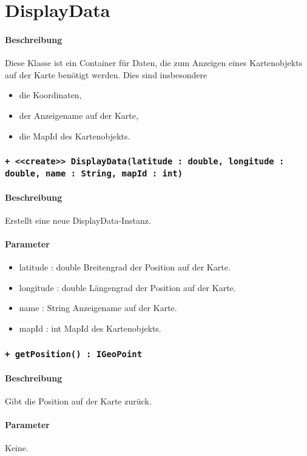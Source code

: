 \section{DisplayData}
\paragraph*{Beschreibung}
Diese Klasse ist ein Container für Daten, die zum Anzeigen eines Kartenobjekts auf der 
Karte benötigt werden. Dies sind insbesondere
\begin{itemize}
    \item die Koordinaten,
    \item der Anzeigename auf der Karte,
    \item die MapId des Kartenobjekts.
\end{itemize}

\subsubsection{\texttt{+ <<create>> DisplayData(latitude : double, longitude : double, name : String, mapId : int)}}%
\paragraph*{Beschreibung}
Erstellt eine neue DisplayData-Instanz.
\paragraph*{Parameter}
\begin{itemize}
    \item latitude : double Breitengrad der Position auf der Karte.
    \item longitude : double Längengrad der Position auf der Karte.
    \item name : String Anzeigename auf der Karte.
    \item mapId : int MapId des Kartenobjekts.
\end{itemize}

\subsubsection{\texttt{+ getPosition() : IGeoPoint}}%
\paragraph*{Beschreibung}
Gibt die Position auf der Karte zurück.
\paragraph*{Parameter}
Keine.
